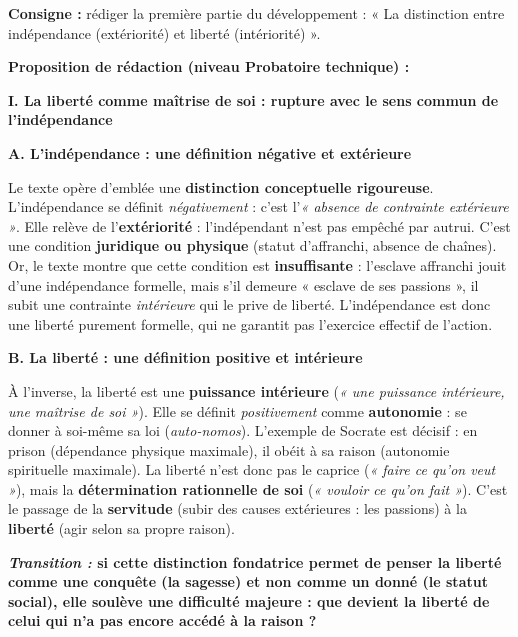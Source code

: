 \documentclass[11pt]{article}
\begin{document}
\begin{exoresolu}
\textbf{Consigne :} rédiger la première partie du développement : « La distinction entre indépendance (extériorité) et liberté (intériorité) ».

\tcblower
\textbf{Proposition de rédaction (niveau Probatoire technique) :}

\textbf{I. La liberté comme maîtrise de soi : rupture avec le sens commun de l'indépendance}

\textbf{A. L'indépendance : une définition négative et extérieure}

Le texte opère d'emblée une \textbf{distinction conceptuelle rigoureuse}. L'indépendance se définit \emph{négativement} : c'est l'\emph{« absence de contrainte extérieure »}. Elle relève de l'\textbf{extériorité} : l'indépendant n'est pas empêché par autrui. C'est une condition \textbf{juridique ou physique} (statut d'affranchi, absence de chaînes). Or, le texte montre que cette condition est \textbf{insuffisante} : l'esclave affranchi jouit d'une indépendance formelle, mais s'il demeure « esclave de ses passions », il subit une contrainte \emph{intérieure} qui le prive de liberté. L'indépendance est donc une liberté purement formelle, qui ne garantit pas l'exercice effectif de l'action.

\textbf{B. La liberté : une définition positive et intérieure}

À l'inverse, la liberté est une \textbf{puissance intérieure} (\emph{« une puissance intérieure, une maîtrise de soi »}). Elle se définit \emph{positivement} comme \textbf{autonomie} : se donner à soi-même sa loi (\emph{auto-nomos}). L'exemple de Socrate est décisif : en prison (dépendance physique maximale), il obéit à sa raison (autonomie spirituelle maximale). La liberté n'est donc pas le caprice (\emph{« faire ce qu'on veut »}), mais la \textbf{détermination rationnelle de soi} (\emph{« vouloir ce qu'on fait »}). C'est le passage de la \textbf{servitude} (subir des causes extérieures : les passions) à la \textbf{liberté} (agir selon sa propre raison).

\textbf{\textit{Transition :} si cette distinction fondatrice permet de penser la liberté comme une conquête (la sagesse) et non comme un donné (le statut social), elle soulève une difficulté majeure : que devient la liberté de celui qui n'a pas encore accédé à la raison ?}
\end{exoresolu}
\end{document}
